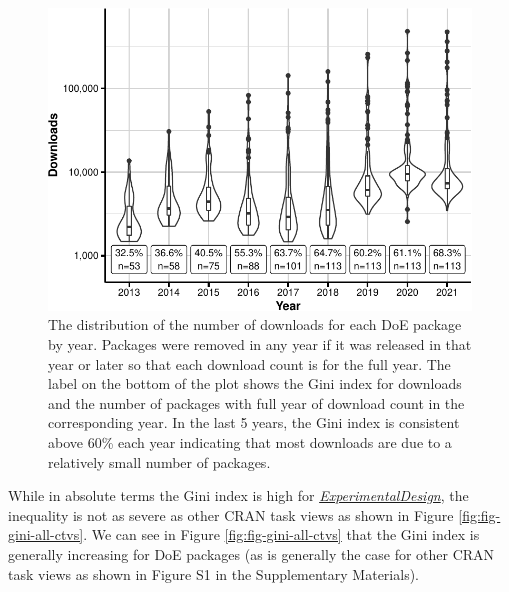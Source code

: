 \documentclass{article}
\begin{document}
\begin{figure}[htbp]

{\centering \includegraphics{figures/download-share-1} 

}

\caption{The distribution of the number of downloads for each DoE package by year. Packages were removed in any year if it was released in that year or later so that each download count is for the full year. The label on the bottom of the plot shows the Gini index for downloads and the number of packages with full year of download count in the corresponding year. In the last 5 years, the Gini index is consistent above 60\% each year indicating that most downloads are due to a relatively small number of packages.}\label{fig:download-share}
\end{figure}

While in absolute terms the Gini index is high for
\href{http://CRAN.R-project.org/view=ExperimentalDesign}{\emph{ExperimentalDesign}},
the inequality is not as severe as other CRAN task views as shown in
Figure \ref{fig:fig-gini-all-ctvs}. We can see in Figure
\ref{fig:fig-gini-all-ctvs} that the Gini index is generally increasing
for DoE packages (as is generally the case for other CRAN task views as
shown in Figure S1 in the Supplementary Materials).
\end{document}

